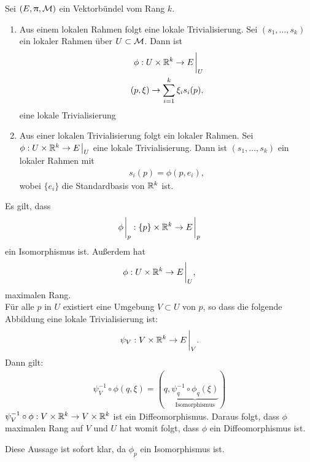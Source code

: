 \begin{satz}
\label{satz:lokalrahmentrivialisierung}
Sei $(E, \uppi, \mathcal{M})$ ein Vektorbündel vom Rang $k$.
\begin{enumerate}
\item Aus einem lokalen Rahmen folgt eine lokale Trivialisierung.
Sei $(s_1, \dots, s_k)$ ein lokaler Rahmen über $U\subset\mathcal{M}$.
Dann ist 
\begin{align}
\phi : U \times \R^k \to E \eval_U\\
(p, \xi) \to \sum^k_{i=1} \xi_i s_i (p),
\end{align}
eine lokale Trivialisierung
\item  Aus einer lokalen Trivialisierung folgt ein lokaler Rahmen.
Sei $\phi: U \times \R^k \to E \eval_U$ eine lokale Trivialisierung.
Dann ist $(s_1, \dots, s_k)$ ein lokaler Rahmen mit 
\begin{align}
s_i(p) = \phi (p, e_i),
\end{align} 
wobei $\{ e_i \}$ die Standardbasis von $\mathbb{R}^k$ ist.
\end{enumerate}
\end{satz}
\begin{bew}
Es gilt, dass 
\begin{align}
\phi \eval_p : \{ p \} \times \R^k \to E \eval_p
\end{align}
ein Isomorphismus ist.
Außerdem hat
\begin{align}
\phi : U \times \R^k \to E \eval_U,
\end{align}
maximalen Rang.\\
Für alle $p$ in $U$ existiert eine Umgebung $V \subset U$ von $p$, so dass die folgende Abbildung eine lokale Trivialisierung ist:
\begin{align}
\psi_V : V\times \R^k \to E \eval_V.
\end{align}
Dann gilt:
\begin{align}
\psi^{-1}_V \circ  \phi (q, \xi) = (q, \underbrace{\psi^{-1}_q \circ \phi_q(\xi)}_{\mathrm{Isomorphismus}})
\end{align}
$\psi^{-1}_V \circ \phi : V \times \mathbb{R}^k \to V \times \mathbb{R}^k$ ist ein Diffeomorphismus.
Daraus folgt, dass $\phi$ maximalen Rang auf $V$ und $U$ hat womit folgt, dass $\phi$ ein Diffeomorphismus ist.
\end{bew}
\begin{bew}
Diese Aussage ist sofort klar, da $\phi_p$ ein Isomorphismus ist.
\end{bew}

